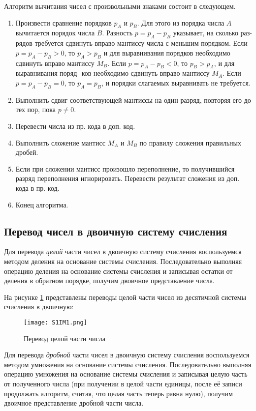 Алгоритм вычитания чисел с произвольными знаками состоит
в следующем.
\begin{enumerate}
    \item Произвести сравнение порядков $p_A$ и $p_B$. Для этого из порядка числа $A$
вычитается порядок числа $B$. Разность $p = p_A − p_B$ указывает, на сколько раз-
рядов требуется сдвинуть вправо мантиссу числа с меньшим порядком. Если
$p = p_A − p_B > 0$, то $p_A > p_B$ и для выравнивания порядков необходимо сдвинуть
вправо мантиссу $M_B$. Если $p = p_A − p_B < 0$, то $p_B > p_A$, и для выравнивания поряд-
ков необходимо сдвинуть вправо мантиссу $M_A$. Если $p = p_A − p_B = 0$, то $p_A = p_B$, и
порядки слагаемых выравнивать не требуется.
    \item Выполнить сдвиг соответствующей мантиссы на один разряд, повторяя
его до тех пор, пока $p ≠ 0$.
    \item Перевести числа из пр. кода в доп. код.
    \item Выполнить сложение мантисс $M_A$ и $M_B$ по правилу сложения правильных дробей.
    \item Если при сложении мантисс произошло переполнение, то
получившийся разряд переполнения игнорировать. Перевести результат сложения из доп. кода в пр. код.
    \item Конец алгоритма.\cite{lucik}
\end{enumerate}

\subsection{Перевод чисел в двоичную систему счисления}

Для перевода \textit{целой} части чисел в двоичную систему счисления воспользуемся
методом деления на основание системы счисления. Последовательно
выполняя операцию деления на основание системы счисления и записывая
остатки от деления в обратном порядке, получим двоичное представление
числа.


На рисунке \ref{fig:section1:conversionOfInteger} представлены переводы целой части чисел из десятичной системы счисления в двоичную:
\begin{figure}[ht!]
    \centering
    \texttt{[image: S1IM1.png]}
    \caption{Перевод целой части числа}
    \label{fig:section1:conversionOfInteger}
\end{figure}

Для перевода \textit{дробной} части чисел в двоичную систему счисления воспользуемся
методом умножения на основание системы счисления. Последовательно
выполняя операцию умножения на основание системы счисления и записывая целую часть от полученного числа (при получении в целой части единицы, после её записи продолжать алгоритм, считая, что целая часть теперь равна нулю), получим двоичное представление дробной части числа.

